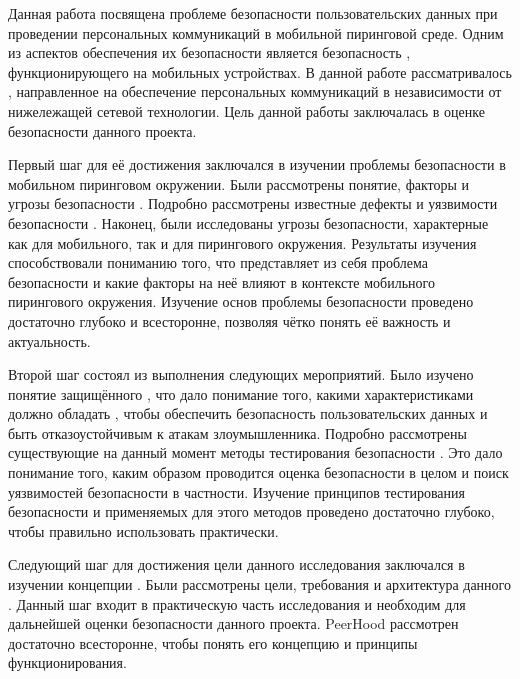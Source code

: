 %
%
Данная работа посвящена проблеме безопасности пользовательских данных при проведении персональных коммуникаций в мобильной пиринговой среде. 
%
Одним из аспектов обеспечения их безопасности является безопасность , функционирующего на мобильных устройствах. 
%
В данной работе рассматривалось  , направленное на обеспечение персональных коммуникаций в независимости от нижележащей сетевой технологии. 
%
Цель данной работы заключалась в оценке безопасности данного проекта. 

%
Первый шаг для её достижения заключался в изучении проблемы безопасности  в мобильном пиринговом окружении. 
%
Были рассмотрены понятие, факторы и угрозы безопасности . 
%
Подробно рассмотрены известные дефекты и уязвимости безопасности . 
%
Наконец, были исследованы угрозы безопасности, характерные как для мобильного, так и для пирингового окружения. 
%
Результаты изучения способствовали пониманию того, что представляет из себя проблема безопасности  и какие факторы на неё влияют в контексте мобильного пирингового окружения. 
%
Изучение основ проблемы безопасности  проведено достаточно глубоко и всесторонне, позволяя чётко понять её важность и актуальность. 

%
Второй шаг состоял из выполнения следующих мероприятий. 
%
Было изучено понятие защищённого , что дало понимание того, какими характеристиками должно обладать , чтобы обеспечить безопасность пользовательских данных и быть отказоустойчивым к атакам злоумышленника. 
%
Подробно рассмотрены существующие на данный момент методы тестирования безопасности . 
%
Это дало понимание того, каким образом проводится оценка безопасности  в целом и поиск уязвимостей безопасности в частности. 
%
Изучение принципов тестирования безопасности и применяемых для этого методов проведено достаточно глубоко, чтобы правильно использовать практически. 

%
Следующий шаг для достижения цели данного исследования заключался в изучении концепции . 
%
Были рассмотрены цели, требования и архитектура данного . 
%
Данный шаг входит в практическую часть исследования и необходим для дальнейшей оценки безопасности данного проекта. 
%
PeerHood рассмотрен достаточно всесторонне, чтобы понять его концепцию и принципы функционирования. 


